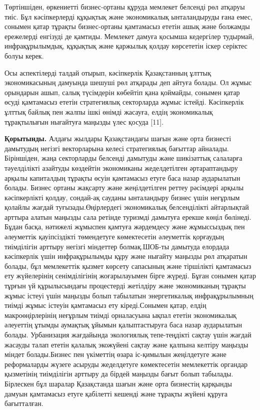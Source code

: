 \begin{multicols}{2}
Төртіншіден, өркениетті бизнес-ортаны құруда мемлекет белсенді рөл
атқаруы тиіс. Бұл кәсіпкерлерді құқықтық және экономикалық ынталандыруды
ғана емес, сонымен қатар тұрақты бизнес-ортаны қамтамасыз ететін ашық
және болжамды ережелерді енгізуді де қамтиды. Мемлекет дамуға қосымша
кедергілер тудырмай, инфрақұрылымдық, құқықтық және қаржылық қолдау
көрсететін іскер серіктес болуы керек.

Осы аспектілерді талдай отырып, кәсіпкерлік Қазақстанның ұлттық
экономикасының дамуында шешуші рөл атқарады деп айтуға болады. Ол жұмыс
орындарын ашып, салық түсімдерін көбейтіп қана қоймайды, сонымен қатар
өсуді қамтамасыз ететін стратегиялық секторларда жұмыс істейді.
Кәсіпкерлік ұлттық байлық пен жалпы ішкі өнімді жасауға, елдің
экономикалық тұрақтылығын нығайтуға маңызды үлес қосуда {[}11{]}.

{\bfseries Қорытынды.} Алдағы жылдары Қазақстандағы шағын және орта бизнесті
дамытудың негізгі векторларына келесі стратегиялық бағыттар айналады.
Біріншіден, жаңа секторларды белсенді дамытуды және шикізаттық салаларға
тәуелділікті азайтуды көздейтін экономиканы жеделдетілген әртараптандыру
арқылы капиталдың тұрақты өсуін қамтамасыз етуге баса назар аударылатын
болады. Бизнес ортаны жақсарту және жеңілдетілген реттеу рәсімдері
арқылы кәсіпкерлікті қолдау, сондай-ақ сауданы ынталандыру бизнес үшін
неғұрлым қолайлы жағдай туғызады.Өңірлердегі экономикалық белсенділікті
айтарлықтай арттыра алатын маңызды сала ретінде туризмді дамытуға ерекше
көңіл бөлінеді. Бұдан басқа, нәтижелі жұмыспен қамтуға жәрдемдесу және
жұмыссыздық пен әлеуметтік қауіпсіздікті төмендетуге көмектесетін
әлеуметтік қорғаудың тиімділігін арттыру негізгі міндеттер болмақ.ШОБ-ты
дамытуда елордада кәсіпкерлік үшін инфрақұрылымды құру және нығайту
маңызды рөл атқаратын болады, бұл мемлекеттік қызмет көрсету сапасының
және тіршілікті қамтамасыз ету жүйелерінің сенімділігінің жоғарылауымен
бірге жүреді. Бұған сонымен қатар тұрғын үй құрылысындағы процестерді
жетілдіру және экономиканың тұрақты жұмыс істеуі үшін маңызды болып
табылатын энергетикалық инфрақұрылымның тиімді жұмыс істеуін қамтамасыз
ету кіреді.Сонымен қатар, елдің макроөңірлерінің неғұрлым тиімді
орналасуына ықпал ететін экономикалық әлеуеттің ұтымды аумақтық ұйымын
қалыптастыруға баса назар аударылатын болады. Урбанизация жағдайында
экологиялық тепе-теңдікті сақтау үшін жағдай жасауды талап ететін
қалалық экожүйені сақтау және қалпына келтіру маңызды міндет
болады.Бизнес пен үкіметтің өзара іс-қимылын жеңілдетуге және
реформаларды жүзеге асыруды жеделдетуге көмектесетін мемлекеттік
органдар қызметінің тиімділігін арттыру да бірдей маңызды бағыт болып
табылады. Бірлескен бұл шаралар Қазақстанда шағын және орта бизнестің
қарқынды дамуын қамтамасыз етуге қабілетті кешенді және тұрақты жүйені
құруға бағытталған.
\end{multicols}

